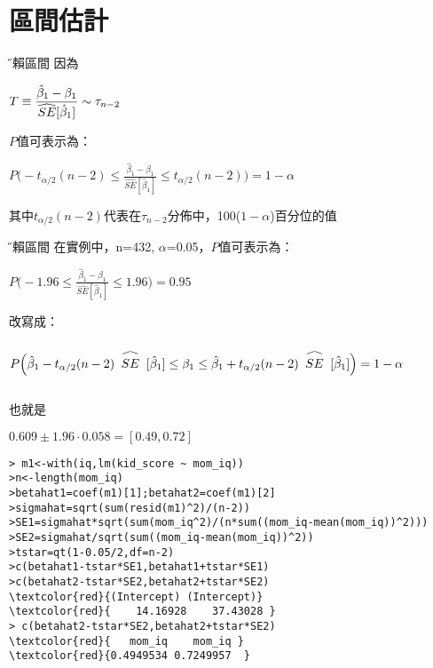 \documentclass[xcolor=dvipsnames]{beamer}
\newcommand\reallywidehat[1]{%
\begin{array}{c}
\stretchto{
  \scaleto{
    \scalerel*[\widthof{#1}]{\bigwedge}
    {\rule[-\textheight/2]{1ex}{\textheight}} %
  }{1.25\textheight} %
}{0.5ex}\\           %
#1\\                 %
\rule{-1ex}{0ex}
\end{array}
}
\begin{document}
\section{區間估計}
\begin{frame}{\H 信賴區間}
因為
\begin{center}
$T\equiv \mathlarger{\frac{\hat{\beta}_{1}-\beta_{1}}{\widehat{SE}[\hat{\beta}_{1}]}}\sim \tau_{n-2}$
\end{center}
$P$值可表示為：
\begin{center}
$P\Big(-t_{\alpha/2}(n-2)\leq \frac{\hat{\beta}_{1}-\beta_{1}}{\widehat{SE}[\hat{\beta}_{1}]}\leq t_{\alpha/2}(n-2)\Big)=1-\alpha$
\end{center}
其中$t_{\alpha/2}(n-2)$代表在$\tau_{n-2}$分佈中，100($1-\alpha$)百分位的值
\end{frame}
\begin{frame}{\H 信賴區間}
在實例中，n=432, $\alpha$=0.05，$P$值可表示為：
\begin{center}
$P\Big(-1.96\leq \frac{\hat{\beta}_{1}-\beta_{1}}{\widehat{SE}[\hat{\beta}_{1}]}\leq 1.96\Big)=0.95$
\end{center}
改寫成：
\begin{center}
$P\Big(\hat{\beta}_{1}-t_{\alpha/2}(n-2)\reallywidehat{SE}[\hat{\beta}_{1}]\leq  \beta_{1}\leq \hat{\beta}_{1}+t_{\alpha/2}(n-2)\reallywidehat{SE}[\hat{\beta}_{1}]\Big)=1-\alpha$
\end{center}
也就是
\begin{center}
$0.609\pm 1.96\cdot 0.058=[0.49,0.72]$
\end{center}
\end{frame}
\begin{frame}[fragile=singleslide]
\begin{Verbatim}[frame=single,label=R code,
fontseries=b,xleftmargin=2mm,commandchars=\\\{\},
formatcom=\color{blue}]
> m1<-with(iq,lm(kid_score ~ mom_iq))
>n<-length(mom_iq)
>betahat1=coef(m1)[1];betahat2=coef(m1)[2]
>sigmahat=sqrt(sum(resid(m1)^2)/(n-2))
>SE1=sigmahat*sqrt(sum(mom_iq^2)/(n*sum((mom_iq-mean(mom_iq))^2)))
>SE2=sigmahat/sqrt(sum((mom_iq-mean(mom_iq))^2))
>tstar=qt(1-0.05/2,df=n-2)
>c(betahat1-tstar*SE1,betahat1+tstar*SE1)
>c(betahat2-tstar*SE2,betahat2+tstar*SE2)
\textcolor{red}{(Intercept) (Intercept)} 
\textcolor{red}{    14.16928    37.43028 }
> c(betahat2-tstar*SE2,betahat2+tstar*SE2)
\textcolor{red}{   mom_iq    mom_iq }
\textcolor{red}{0.4949534 0.7249957  }
\end{Verbatim}
\end{frame}
\end{document}
